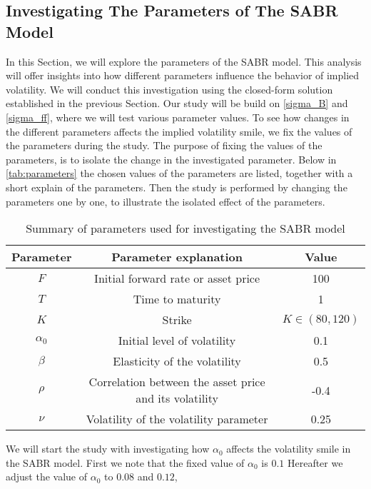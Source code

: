 \subsection{Investigating The Parameters of The SABR Model} \label{invest_sabr}
In this Section, we will explore the parameters of the SABR model. This analysis will offer insights into 
how different parameters influence the behavior of implied volatility. We will conduct this investigation using 
the closed-form solution established in the previous Section. Our study will be build on  \autoref{sigma_B} and 
\autoref{sigma_ff}, where we will test various parameter values. To see how changes in the different parameters
affects the implied volatility smile, we fix the values of the parameters during the study. 
The purpose of fixing the values of the parameters, is to isolate the change in the investigated parameter. 
Below in \autoref{tab:parameters} the chosen values of the parameters are listed, together with a short
explain of the parameters. Then the study is performed by changing the parameters one by one, to illustrate the 
isolated effect of the parameters. 
\\
\begin{table}[H]
    \centering
    \begin{tabular}{ccc}
      \toprule
      \textbf{Parameter} & \textbf{Parameter explanation} & \textbf{Value} \\
      \midrule
      \rowcolor{lightgray!40} $F$ & Initial forward rate or asset price & 100 \\
      $T$ & Time to maturity & 1 \\
      \rowcolor{lightgray!40} $K$ & Strike & $K \in (80,120)$ \\
      $\alpha_0$ & Initial level of volatility & 0.1 \\
      \rowcolor{lightgray!40} $\beta$ & Elasticity of the volatility & 0.5 \\
      $\rho$ & Correlation between the asset price and its volatility & -0.4 \\
      \rowcolor{lightgray!40} $\nu$ & Volatility of the volatility parameter & 0.25 \\
      \bottomrule
    \end{tabular}
    \caption{Summary of parameters used for investigating the SABR model}
    \label{tab:parameters}
\end{table}
\noindent
We will start the study with investigating how $\alpha_0$ affects the volatility smile in the SABR model. 
First we note that the fixed value of $\alpha_0$ is $0.1$ Hereafter we adjust the value of $\alpha_0$ to $0.08$ and $0.12$,
